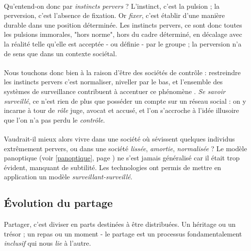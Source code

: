 \paragraph{} Qu'entend-on donc par \emph{instincts pervers} ? L'instinct, c'est la pulsion ; la perversion, c'est l'absence
de fixation. Or \emph{fixer}, c'est \guillemotleft établir d'une manière durable dans une position déterminée\guillemotright \cite{Fixe0}.
Les instincts pervers, ce sont donc toutes les pulsions immorales, "hors norme", hors du cadre déterminé, en décalage avec la réalité
telle qu'elle est acceptée - ou définie - par le groupe ; la perversion n'a de sens que dans un contexte sociétal.

\paragraph{} Nous touchons donc bien à la raison d'être des sociétés de contrôle : restreindre les instincts pervers c'est
normaliser, niveller par le bas, et l'ensemble des systèmes de surveillance contribuent à accentuer ce phénomène \cite{SocialMedia0}.
\emph{Se savoir surveillé}, ce n'est rien de plus que posséder un compte sur un réseau social : on y incarne à tour de
\emph{rôle} juge, avocat et accusé, et l'on s'accroche à l'idée illusoire que l'on n'a pas perdu le \emph{contrôle}.

\paragraph{} Vaudrait-il mieux alors vivre dans une société où sévissent quelques individus extrêmement pervers, ou dans
une société \emph{lissée}, \emph{amortie}, \emph{normalisée} ? Le modèle panoptique (voir \ref{panoptique}, page \pageref{panoptique})
ne s'est jamais généralisé car il était trop évident, manquant de subtilité. Les technologies ont permis de mettre en application
un modèle \emph{surveillant-surveillé}.

\paragraph{}

\subsection*{Évolution du partage}

\paragraph{} Partager, c'est \guillemotleft diviser en parts destinées à être distribuées\guillemotright \cite{Partage0}.
Un héritage ou un trésor ; un repas ou un moment - le partage est un processus fondamentalement \emph{inclusif} qui nous
\emph{lie} à l'autre.

